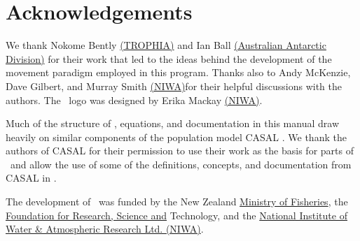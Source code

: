 \section{Acknowledgements\label{sec:acknowledgements}}

We thank Nokome Bently \href{http://www.trophia.co.nz}{(TROPHIA)} and Ian Ball \href{http://www.aad.gov.au}{(Australian Antarctic Division)} for their work that led to the ideas behind the development of the movement paradigm employed in this  program. Thanks also to Andy McKenzie, Dave Gilbert, and Murray Smith \href{http://www.niwa.co.nz}{(NIWA)}for their helpful discussions with the authors. The \SPM\ logo was designed by Erika Mackay \href{http://www.niwa.co.nz}{(NIWA)}. 

Much of the structure of \SPM, equations, and documentation in this manual draw heavily on similar components of the population model CASAL \citep{1388}. We thank the authors of CASAL for their permission to use their work as the basis for parts of \SPM\ and allow the use of some of the definitions, concepts, and documentation from CASAL in \SPM.

The development of \SPM\ was funded by the New Zealand \href{http://www.fish.govt.nz}{Ministry of Fisheries}, the \href{http://www.frst.govt.nz}{Foundation for Research, Science and} Technology, and the \href{http://www.niwa.co.nz}{National Institute of Water \& Atmospheric Research Ltd. (NIWA)}. 
